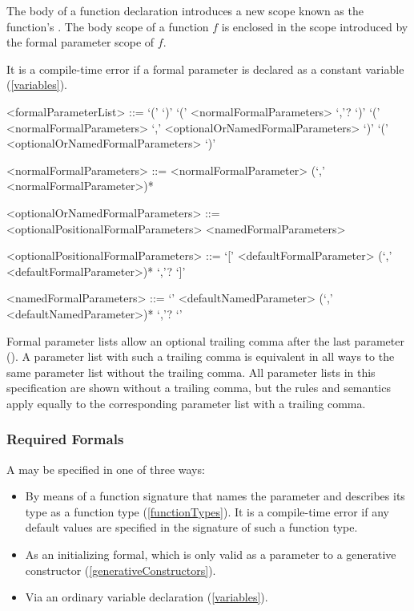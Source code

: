 \documentclass[makeidx]{article}
\begin{document}
\LMHash{}%
The body of a function declaration introduces
a new scope known as the function's
.
The body scope of a function $f$ is enclosed in the scope introduced by
the formal parameter scope of $f$.

\LMHash{}%
It is a compile-time error if a formal parameter
is declared as a constant variable (\ref{variables}).

\begin{grammar}
<formalParameterList> ::= `(' `)'
  \alt `(' <normalFormalParameters> `,'? `)'
  \alt `(' <normalFormalParameters> `,' <optionalOrNamedFormalParameters> `)'
  \alt `(' <optionalOrNamedFormalParameters> `)'

<normalFormalParameters> ::= \gnewline{}
  <normalFormalParameter> (`,' <normalFormalParameter>)*

<optionalOrNamedFormalParameters> ::= <optionalPositionalFormalParameters>
  \alt <namedFormalParameters>

<optionalPositionalFormalParameters> ::= \gnewline{}
  `[' <defaultFormalParameter> (`,' <defaultFormalParameter>)* `,'? `]'

<namedFormalParameters> ::= \gnewline{}
  `{' <defaultNamedParameter> (`,' <defaultNamedParameter>)* `,'? `}'
\end{grammar}

\LMHash{}%
Formal parameter lists allow an optional trailing comma
after the last parameter ().
A parameter list with such a trailing comma is
equivalent in all ways to the same parameter list without the trailing comma.
All parameter lists in this specification are shown without a trailing comma,
but the rules and semantics apply equally to
the corresponding parameter list with a trailing comma.


\subsubsection{Required Formals}

\LMHash{}%
A  may be specified in one of three ways:
\begin{itemize}
\item
  By means of a function signature that names the parameter and
  describes its type as a function type (\ref{functionTypes}).
  It is a compile-time error if any default values are specified
  in the signature of such a function type.
\item
  As an initializing formal, which is only valid as a parameter to
  a generative constructor (\ref{generativeConstructors}).
\item
  Via an ordinary variable declaration (\ref{variables}).
\end{itemize}
\end{document}

